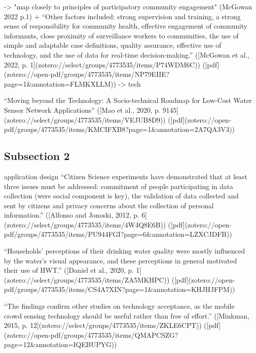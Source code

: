 -> "map closely to principles of participatory community engagement" (McGowan 2022 p.1)
+ “Other factors included: strong supervision and training, a strong sense of responsibility for community health, effective engagement of community informants, close proximity of surveillance workers to communities, the use of simple and adaptable case definitions, quality assurance, effective use of technology, and the use of data for real-time decision-making.” ([McGowan et al., 2022, p. 1](zotero://select/groups/4773535/items/P74WDM6C)) ([pdf](zotero://open-pdf/groups/4773535/items/NP79EIIE?page=1&annotation=FLMKXLLM))
-> tech

“Moving beyond the Technology: A Socio-technical Roadmap for Low-Cost Water Sensor Network Applications” ([Mao et al., 2020, p. 9145](zotero://select/groups/4773535/items/VEJUB8D9)) ([pdf](zotero://open-pdf/groups/4773535/items/KMCIFXB8?page=1&annotation=2A7QA3V3))


\subsection{Subsection 2}

application design 
“Citizen Science experiments have demonstrated that at least three issues must be addressed: commitment of people participating in data collection (were social component is key), the validation of data collected and sent by citizens and privacy concerns about the collection of personal information.” ([Alfonso and Jonoski, 2012, p. 6](zotero://select/groups/4773535/items/4W4Q8E6B)) ([pdf](zotero://open-pdf/groups/4773535/items/PU944FGI?page=6\&annotation=LZXCJDFB))

“Households’ perceptions of their drinking water quality were mostly influenced by the water’s visual appearance, and these perceptions in general motivated their use of HWT.” ([Daniel et al., 2020, p. 1](zotero://select/groups/4773535/items/ZA5MKHPC)) ([pdf](zotero://open-pdf/groups/4773535/items/CS4A7XIN?page=1&annotation=KHJHJFPM))

“The findings confirm other studies on technology acceptance, as the mobile crowd sensing technology should be useful rather than free of effort.” ([Minkman, 2015, p. 12](zotero://select/groups/4773535/items/ZKLE6CPT)) ([pdf](zotero://open-pdf/groups/4773535/items/QMAPCSZG?page=12&annotation=IQEBUPYG))



